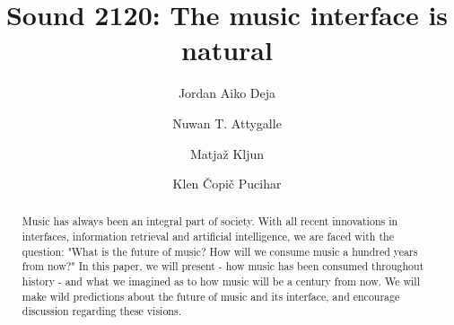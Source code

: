 \documentclass[acmtog]{acmart}
\begin{document}
\title{Sound 2120: The music interface is natural}

\author{Jordan Aiko Deja}
\author{Nuwan T. Attygalle}
\authornotemark[1]

\author{Matjaž Kljun}
\author{Klen Čopič Pucihar}
\authornotemark[1]


\renewcommand{\shortauthors}{Deja and Attygalle, et. al. }

\begin{abstract}
  Music has always been an integral part of society. With all recent innovations in interfaces, information retrieval and artificial intelligence, we are faced with the question: "What is the future of music? How will we consume music a hundred years from now?" In this paper, we will present - how music has been consumed throughout history - and what we imagined as to how music will be a century from now. We will make wild predictions about the future of music and its interface, and encourage discussion regarding these visions. 
\end{abstract}
\end{document}
